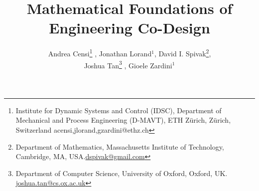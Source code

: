 \documentclass[paper=6in:9in,pagesize=pdftex,
 headinclude=off,footinclude=on,11pt,twoside]{scrbook}
\begin{document}
\title{Mathematical Foundations of Engineering Co-Design}
\date{}

\author{Andrea Censi\thanks{\footnotesize{Institute for Dynamic Systems and Control (IDSC), Department of Mechanical and Process Engineering (D-MAVT), ETH Z\"urich, Z\"urich, Switzerland
        acensi,jlorand,gzardini@ethz.ch}}  ,
Jonathan Lorand$^1$,
David I. Spivak\thanks{\footnotesize{Department of Mathematics, Massachusetts Institute of Technology, Cambridge, MA, USA.\href{dspivak@gmail.com}{dspivak@gmail.com}}},\\
Joshua Tan\thanks{\footnotesize{Department of Computer Science, University of Oxford, Oxford, UK. \href{joshua.tan@cs.ox.ac.uk}{joshua.tan@cs.ox.ac.uk}}}  ,
        Gioele Zardini$^1$}
\end{document}
